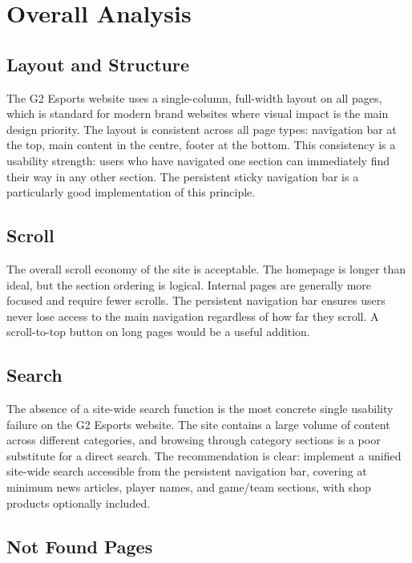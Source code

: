 \documentclass[12pt, a4paper]{article}
\begin{document}
\newpage
\section{Overall Analysis}

\subsection{Layout and Structure}

The G2 Esports website uses a single-column, full-width layout on all pages, which is standard for modern brand websites where visual impact is the main design priority. The layout is consistent across all page types: navigation bar at the top, main content in the centre, footer at the bottom. This consistency is a usability strength: users who have navigated one section can immediately find their way in any other section. The persistent sticky navigation bar is a particularly good implementation of this principle.

\subsection{Scroll}

The overall scroll economy of the site is acceptable. The homepage is longer than ideal, but the section ordering is logical. Internal pages are generally more focused and require fewer scrolls. The persistent navigation bar ensures users never lose access to the main navigation regardless of how far they scroll. A scroll-to-top button on long pages would be a useful addition.

\subsection{Search}

The absence of a site-wide search function is the most concrete single usability failure on the G2 Esports website. The site contains a large volume of content across different categories, and browsing through category sections is a poor substitute for a direct search. The recommendation is clear: implement a unified site-wide search accessible from the persistent navigation bar, covering at minimum news articles, player names, and game/team sections, with shop products optionally included.

\subsection{Not Found Pages}
\end{document}
